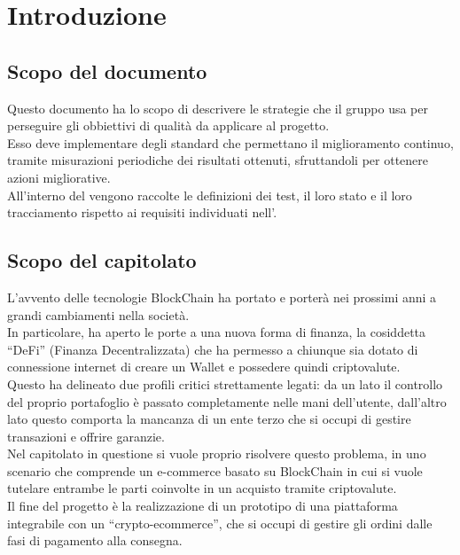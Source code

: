 \section{Introduzione}\label{section:introduzione}

\subsection{Scopo del documento}\label{subsection:scopo_documento}
Questo documento ha lo scopo di descrivere le strategie che il gruppo usa per perseguire gli obbiettivi di qualità da applicare al progetto.\\
Esso deve implementare degli standard che permettano il miglioramento continuo, tramite misurazioni periodiche dei risultati ottenuti, sfruttandoli per ottenere azioni migliorative.\\
All'interno del \docNamePdP{} vengono raccolte le definizioni dei test, il loro stato e il loro tracciamento rispetto ai requisiti individuati nell'\docNameVersionAdR{}.

\subsection{Scopo del capitolato}\label{subsection:scopo_capitolato}
L'avvento delle tecnologie BlockChain\glo{} ha portato e porterà nei prossimi anni a grandi cambiamenti nella società.\\
In particolare, ha aperto le porte a una nuova forma di finanza, la cosiddetta “DeFi” (Finanza Decentralizzata) che ha permesso a chiunque sia dotato di connessione internet di creare un Wallet\glo{} e possedere quindi criptovalute\glo{}.\\
Questo ha delineato due profili critici strettamente legati: da un lato il controllo del proprio portafoglio è passato completamente nelle mani dell'utente, dall'altro lato questo comporta la mancanza di un ente terzo che si occupi di gestire transazioni e offrire garanzie.\\
Nel capitolato in questione si vuole proprio risolvere questo problema, in uno scenario che comprende un e-commerce\glo{} basato su BlockChain\glo{} in cui si vuole tutelare entrambe le parti coinvolte in un acquisto tramite criptovalute\glo{}.\\
Il fine del progetto è la realizzazione di un prototipo di una piattaforma integrabile con un “crypto-ecommerce”\glo{}, che si occupi di gestire gli ordini dalle fasi di pagamento alla consegna.

